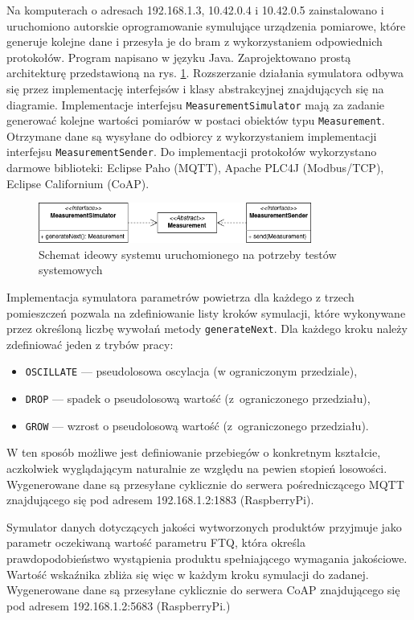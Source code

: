 \documentclass[a4paper, 12pt, twoside]{article}
\begin{document}
Na komputerach o adresach 192.168.1.3, 10.42.0.4 i 10.42.0.5 zainstalowano i uruchomiono
autorskie oprogramowanie symulujące urządzenia pomiarowe, które generuje kolejne dane
i przesyła je do bram z wykorzystaniem odpowiednich protokołów. Program napisano
w języku Java. Zaprojektowano prostą architekturę przedstawioną na rys. \ref{fig:iot-sim}.
Rozszerzanie działania symulatora odbywa się przez implementację interfejsów
i klasy abstrakcyjnej znajdujących się na diagramie. Implementacje interfejsu \texttt{MeasurementSimulator}
mają za zadanie generować kolejne wartości pomiarów w postaci obiektów typu
\texttt{Measurement}. Otrzymane dane są wysyłane do odbiorcy z wykorzystaniem implementacji
interfejsu \texttt{MeasurementSender}. Do implementacji protokołów wykorzystano
darmowe biblioteki: Eclipse Paho (MQTT), Apache PLC4J (Modbus/TCP), Eclipse Californium (CoAP).

\begin{figure}[h]
      \centering
      \includegraphics[width=0.8\textwidth]{iot-sim-architecture.png}
      \caption{Schemat ideowy systemu uruchomionego na potrzeby testów systemowych}
      \label{fig:iot-sim}
\end{figure}

Implementacja symulatora parametrów powietrza dla każdego z trzech pomieszczeń 
pozwala na zdefiniowanie listy kroków
symulacji, które wykonywane przez określoną liczbę wywołań metody
\texttt{generateNext}. Dla każdego kroku należy zdefiniować jeden z trybów pracy:
\begin{itemize}
      \itemsep0em
      \item \texttt{OSCILLATE} --- pseudolosowa oscylacja (w ograniczonym przedziale),
      \item \texttt{DROP} --- spadek o pseudolosową wartość (z~ograniczonego przedziału),
      \item \texttt{GROW} --- wzrost o pseudolosową wartość (z~ograniczonego przedziału).
\end{itemize}
\noindent W ten sposób możliwe jest definiowanie przebiegów o konkretnym kształcie, aczkolwiek
wyglądającym naturalnie ze względu na pewien stopień losowości. Wygenerowane 
dane są przesyłane cyklicznie do serwera pośredniczącego MQTT znajdującego
się pod adresem 192.168.1.2:1883 (RaspberryPi).

Symulator danych dotyczących jakości wytworzonych produktów przyjmuje jako parametr
oczekiwaną wartość parametru FTQ, która określa prawdopodobieństwo wystąpienia
produktu spełniającego wymagania jakościowe. Wartość wskaźnika zbliża się więc
w każdym kroku symulacji do zadanej. Wygenerowane dane są przesyłane cyklicznie
do serwera CoAP znajdującego się pod adresem 192.168.1.2:5683 (RaspberryPi.)
\end{document}
